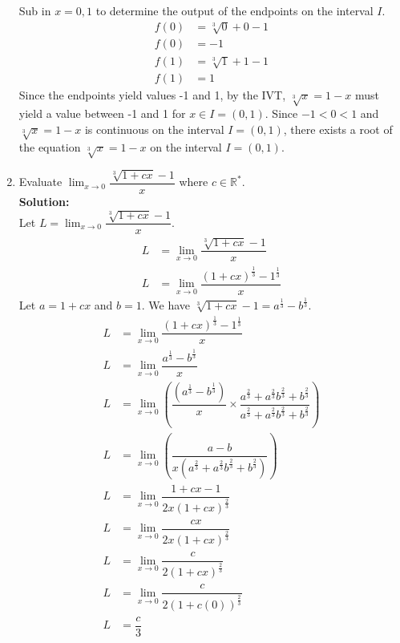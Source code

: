 \documentclass[12pt]{book}
\begin{document}
\begin{enumerate}
Sub in $x=0, 1$ to determine the output of the endpoints on the interval $I$.
\begin{align}
    f(0) &= \sqrt[3]{0} +0 - 1 \\
    f(0) &= -1 \\
    f(1) &= \sqrt[3]{1} +1 - 1 \\
    f(1) &= 1
\end{align}
Since the endpoints yield values -1 and 1, by the IVT, $\sqrt[3]{x}=1-x$ must yield a value between -1 and 1 for $x \in I = (0,1)$. Since $-1 < 0 < 1$ and $\sqrt[3]{x}=1-x$ is continuous on the interval $I = (0,1)$, there exists a root of the equation $\sqrt[3]{x}=1-x$ on the interval $I = (0,1).$

\newpage


\item Evaluate $\lim_{x\to 0}\limits \dfrac{\sqrt[3]{1+cx}-1}{x}$ where $c \in \mathbb{R^*}$. \\

\textbf{Solution:\\}
\setcounter{equation}{0}
Let $L = \lim_{x\to 0}\limits \dfrac{\sqrt[3]{1+cx}-1}{x}$.
\begin{align}
    L &= \lim_{x\to 0}\limits \dfrac{\sqrt[3]{1+cx}-1}{x} \\
    L &= \lim_{x\to 0}\limits \dfrac{(1+cx)^{\frac{1}{3}}-1^{\frac{1}{3}}}{x}
\end{align}
Let $a = 1+cx$ and $b = 1$. We have $\sqrt[3]{1+cx}-1 = a^\frac{1}{3} - b^\frac{1}{3}$. %
\begingroup
\addtolength{\jot}{0.5em}
\begin{align}
    L &= \lim_{x\to 0}\limits \dfrac{(1+cx)^{\frac{1}{3}}-1^{\frac{1}{3}}}{x}\\
    L &= \lim_{x\to 0}\limits \dfrac{a^{\frac{1}{3}}-b^{\frac{1}{3}}}{x}\\
    L &= \lim_{x\to 0}\limits \left(\dfrac{(a^\frac{1}{3}-b^\frac{1}{3})}{x} \times \dfrac{a^{\frac{2}{3}} + a^{\frac{2}{3}}b^{\frac{2}{3}} + b^{\frac{2}{3}}}{a^{\frac{2}{3}} + a^{\frac{2}{3}}b^{\frac{2}{3}} + b^{\frac{2}{3}}}  \right) \\
    L &= \lim_{x\to 0}\limits \left(\dfrac{a-b}{x(a^\frac{2}{3} + a^\frac{2}{3}b^\frac{2}{3} + b^\frac{2}{3})}\right) \\
    L &= \lim_{x\to 0}\limits \dfrac{1+cx - 1}{2x(1+cx)^\frac{2}{3}} \\
    L &= \lim_{x\to 0}\limits \dfrac{cx}{2x(1+cx)^\frac{2}{3}} \\
    L &= \lim_{x\to 0}\limits \dfrac{c}{2(1+cx)^\frac{2}{3}} \\
    L &= \lim_{x\to 0}\limits \dfrac{c}{2(1+c(0))^\frac{2}{3}} \\
    L &= \dfrac{c}{3}
\end{align}
\endgroup


\end{enumerate}
\end{document}
